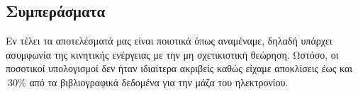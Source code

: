 \documentclass[a4paper]{article}
\begin{document}
\subsection*{Συμπεράσματα}
	Εν τέλει τα αποτελέσματά μας είναι ποιοτικά όπως αναμέναμε, δηλαδή υπάρχει ασυμφωνία της κινητικής ενέργειας με την μη σχετικιστική θεώρηση. Ωστόσο, οι ποσοτικοί υπολογισμοί δεν ήταν ιδιαίτερα ακριβείς καθώς είχαμε αποκλίσεις έως και $~30\%$ από τα βιβλιογραφικά δεδομένα για την μάζα του ηλεκτρονίου.
\end{document}
